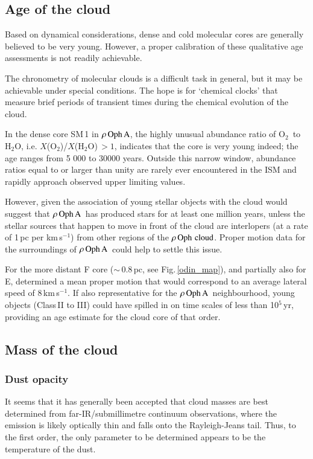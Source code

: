 \documentclass{aa}
\newcommand{\kms}{km\,s$^{-1}$}       %
\newcommand{\water}{H$_{2}$O}
\newcommand{\molo}{O$_{2}$}                     %
\newcommand{\about}{$\sim$}                       %
\newcommand{\powten}[1]{10$^{#1}$}
\newcommand{\roc}{$\rho \, {\rm Oph \,\, cloud}$}
\newcommand{\roa}{$\rho \, {\rm Oph \, A}$}
\begin{document}
\subsection{Age of the cloud}

Based on dynamical considerations, dense and cold molecular cores are generally believed to be very young. However, a proper calibration of these  qualitative age assessments is not readily achievable.

The chronometry of molecular clouds is a difficult task in general, but it may be achievable under special conditions. The hope is for `chemical clocks' that measure brief periods of transient times during the chemical evolution of the cloud. 

In the dense core SM\,1 in \roa, the highly unusual abundance ratio of \molo\ to \water, i.e. $X$(\molo)/$X$(\water)$\,>1$, indicates that the core is very young indeed; the age ranges from 5 000  to  30000 years. Outside this narrow window, abundance ratios equal to or larger than unity are rarely ever encountered in the ISM and rapidly approach observed upper limiting values.

However, given the association of young stellar objects with the cloud would suggest that \roa\ has produced stars for at least one million years, unless the stellar sources that happen to move in front of the cloud are interlopers (at a rate of 1\,pc per \kms) from other regions of the \roc. Proper motion data for the surroundings of \roa\ could help to settle this issue. 

For the more distant F core (\about\,0.8\,pc, see Fig.\,\ref{odin_map}), and partially also for E, \citet{ducourant2017} determined a mean proper motion that would correspond to an average lateral speed of 8\,\kms. If also representative  for the \roa\ neighbourhood, young objects (Class\,II to III) could have spilled in on time scales of less than \powten{5}\,yr, providing an age estimate for the cloud core of that order.

\subsection{Mass of the cloud} 

\subsubsection{Dust opacity}

It seems that it has generally been accepted that cloud masses are best determined from far-IR/submillimetre continuum observations, where the emission is likely optically thin and falls onto the Rayleigh-Jeans tail. Thus, to the first order, the only parameter to be determined appears to be the temperature of the dust. 
\end{document}
